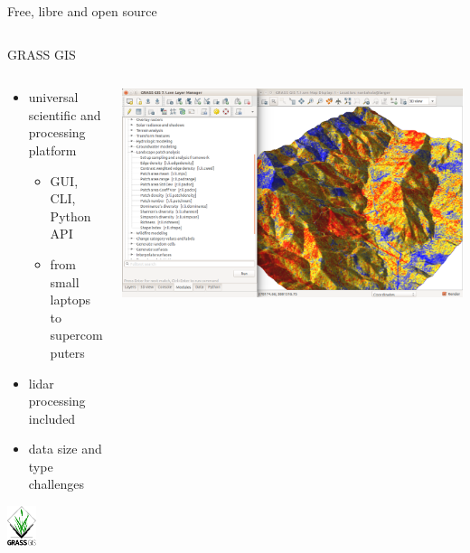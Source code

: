 \documentclass[xcolor={dvipsnames,usenames},beamer,aspectratio=169]{beamer}
\begin{document}
\begin{frame}{Free, libre and open source}
\begin{columns}
\begin{column}{0.3\textwidth}
\end{column}
\end{columns}

\end{frame}


\begin{frame}{GRASS GIS}

\begin{columns}
\begin{column}{0.4\textwidth}

\begin{itemize}
  \item universal scientific and processing platform
  \begin{itemize}
  \item GUI, CLI, Python API
  \item from small laptops to supercomputers
  \end{itemize}
  \item lidar processing included
  \item data size and type challenges
\end{itemize}

\begin{center}
\includegraphics[width=0.3\textwidth]{logos/grass_gis}
\end{center}

\end{column}
\begin{column}{0.55\textwidth}

\begin{center}
  \includegraphics[width=\textwidth]{grass/count_and_modules}
\end{center}


\end{column}
\end{columns}
\end{frame}
\end{document}

